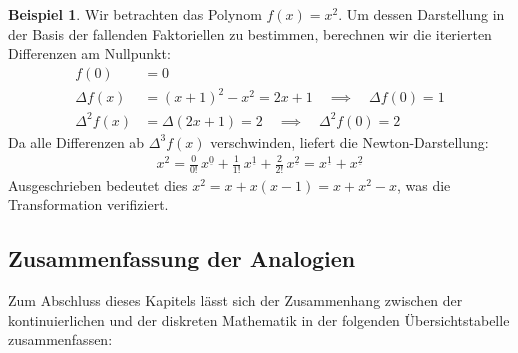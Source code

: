 \documentclass{article}
\theoremstyle{definition}
\newtheorem{bsp}[thm]{Beispiel}
\begin{document}
\begin{bsp}
Wir betrachten das Polynom $f(x) = x^2$. Um dessen Darstellung in der Basis der fallenden Faktoriellen zu bestimmen, berechnen wir die iterierten Differenzen am Nullpunkt:
\begin{align*}
    f(0) &= 0 \\
    \Delta f(x) &= (x+1)^2 - x^2 = 2x+1 \quad \implies \quad \Delta f(0) = 1 \\
    \Delta^2f(x) &= \Delta(2x+1) = 2 \quad \implies \quad \Delta^2f(0) = 2
\end{align*}
Da alle Differenzen ab $\Delta^3 f(x)$ verschwinden, liefert die Newton-Darstellung:
\begin{align*}
    x^2 = \frac{0}{0!}\,x^{\underline{0}} + \frac{1}{1!}\,x^{\underline{1}} + \frac{2}{2!}\,x^{\underline{2}} = x^{\underline{1}} + x^{\underline{2}}
\end{align*}
Ausgeschrieben bedeutet dies $x^2 = x + x(x-1) = x + x^2 - x$, was die Transformation verifiziert.
\end{bsp}


\subsection{Zusammenfassung der Analogien}
Zum Abschluss dieses Kapitels lässt sich der Zusammenhang zwischen der kontinuierlichen und der diskreten Mathematik in der folgenden Übersichtstabelle zusammenfassen:
\end{document}
